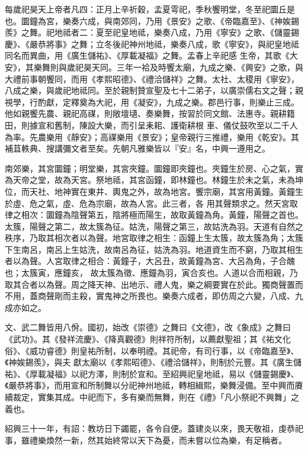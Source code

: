 \begin{pinyinscope}
 每歲祀昊天上帝者凡四：正月上辛祈穀，孟夏雩祀，季秋饗明堂，冬至祀圜丘是也。圜鐘為宮，樂奏六成，與南郊同，乃用《景安》之歌、《帝臨嘉至》、《神娭錫羨》之舞。祀地祗者二：夏至祀皇地祗，樂奏八成，乃用《寧安》之歌、《儲靈錫慶》、《嚴恭將事》之舞；立冬後祀神州地祗，樂奏八成，歌《寧安》，與祀皇地祗同名而異曲，用《廣生儲祐》、《厚載凝福》之舞。孟春上辛祀感
 生帝，其歌《大安》，其樂舞則與歲祀昊天同。三年一袷及時饗太廟，九成之樂、《興安》之歌，與大禮前事朝饗同，而用《孝熙昭德》、《禮洽儲祥》之舞。太社、太稷用《寧安》，八成之樂，與歲祀地祗同。至於親制贊宣聖及七十二弟子，以廣崇儒右文之聲；親視學，行酌獻，定釋奠為大祀，用《凝安》，九成之樂。郡邑行事，則樂止三成。他如親饗先農、親祀高禖，則敞壇壝、奏樂舞，按習於同文館、法惠寺。親耕籍田，則據宣和舊制，陳設大樂，而引呈耒耜、護衛耕根
 車、儀仗鼓吹至以二千人為率。先農樂用《靜安》；高禖樂用《景安》；皇帝親行三推禮，樂用《乾安》。其補苴軼典、搜講彌文者至矣。先朝凡雅樂皆以『安』名，中興一遵用之。



 南郊樂，其宮圜鐘；明堂樂，其宮夾鐘。圜鐘即夾鐘也。夾鐘生於房、心之氣，實為天帝之堂，故為天宮。祭地祗，其宮函鐘，即林鐘也。林鐘生於未之氣，未為坤位，而天社、地神實在東井、輿鬼之外，故為地宮。饗宗廟，其宮用黃鐘。黃鐘生於虛、危之氣，虛、危為宗廟，故為人宮。此三者，各
 用其聲類求之。然天宮取律之相次：圜鐘為陰聲第五，陰將極而陽生，故取黃鐘為角。黃鐘，陽聲之首也。太簇，陽聲之第二，故太簇為征。姑洗，陽聲之第三，故姑洗為羽。天道有自然之秩序，乃取其相次者以為聲。地宮取律之相生：函鐘上生太簇，故太簇為角；太簇下生南呂，南呂上生姑洗，故南呂為征，姑洗為羽。地道資生而不窮，乃取其相生者以為聲。人宮取律之相合：黃鐘子，大呂丑，故黃鐘為宮、大呂為角，子合醜也；太簇寅，應鐘亥，
 故太簇為徵、應鐘為羽，寅合亥也。人道以合而相親，乃取其合者以為聲。周之降天神、出地示、禮人鬼，樂之綱要實在於此。獨商聲置而不用，蓋商聲剛而主殺，實鬼神之所畏也。樂奏六成者，即仿周之六變，八成、九成亦如之。



 文、武二舞皆用八佾。國初，始改《崇德》之舞曰《文德》，改《象成》之舞曰《武功》。其《發祥流慶》、《降真觀德》則祥符所制，以薦獻聖祖；其《祐文化俗》、《威功睿德》則皇祐所制，以奉明禋。其祀帝，有司行事，以《帝臨嘉至》、《神娭錫羨》，與夫
 獻太廟以《孝熙昭德》、《禮洽儲祥》，則制於元豐。其《廣生儲祐》、《厚載凝福》以祀方澤，則制於宣和。至紹興祀皇地祗，易以《儲靈錫慶》、《嚴恭將事》，而用宣和所制舞以分祀神州地祗，轉相緝熙，樂舞浸備。至中興而賡續裁定，實集其成。中祀而下，多有樂而無舞，則在《禮》「凡小祭祀不興舞」之義也。



 紹興三十一年，有詔：教坊日下蠲罷，各令自便。蓋建炎以來，畏天敬祖，虔恭祀事，雖禮樂煥然一新，然其始終常以天下為憂，而未嘗以位為樂，有足稱者。




\end{pinyinscope}
